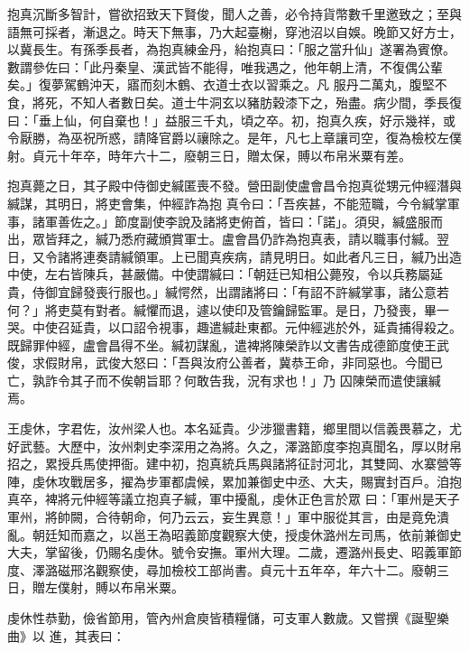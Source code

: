 \begin{pinyinscope}
 抱真沉斷多智計，嘗欲招致天下賢俊，聞人之善，必令持貨幣數千里邀致之；至與語無可採者，漸退之。時天下無事，乃大起臺榭，穿池沼以自娛。晚節又好方士，以冀長生。有孫季長者，為抱真練金丹，紿抱真曰：「服之當升仙」遂署為賓僚。數謂參佐曰：「此丹秦皇、漢武皆不能得，唯我遇之，他年朝上清，不復偶公輩矣。」復夢駕鶴沖天，寤而刻木鶴、衣道士衣以習乘之。凡
 服丹二萬丸，腹堅不食，將死，不知人者數日矣。道士牛洞玄以豬肪穀漆下之，殆盡。病少間，季長復曰：「垂上仙，何自棄也！」益服三千丸，頃之卒。初，抱真久疾，好示幾祥，或令厭勝，為巫祝所惑，請降官爵以禳除之。是年，凡七上章讓司空，復為檢校左僕射。貞元十年卒，時年六十二，廢朝三日，贈太保，賻以布帛米粟有差。



 抱真薨之日，其子殿中侍御史緘匿喪不發。營田副使盧會昌令抱真從甥元仲經潛與緘謀，其明日，將吏會集，仲經詐為抱
 真令曰：「吾疾甚，不能蒞職，今令緘掌軍事，諸軍善佐之。」節度副使李說及諸將吏俯首，皆曰：「諾」。須臾，緘盛服而出，眾皆拜之，緘乃悉府藏頒賞軍士。盧會昌仍詐為抱真表，請以職事付緘。翌日，又令諸將連奏請緘領軍。上已聞真疾病，請見明日。如此者凡三日，緘乃出造中使，左右皆陳兵，甚嚴備。中使謂緘曰：「朝廷已知相公薨歿，令以兵務屬延
 貴，侍御宜歸發喪行服也。」緘愕然，出謂諸將曰：「有詔不許緘掌事，諸公意若何？」將吏莫有對者。緘懼而退，遽以使印及管鑰歸監軍。是日，乃發喪，畢一哭。中使召延貴，以口詔令視事，趣遣緘赴東都。元仲經逃於外，延貴捕得殺之。既歸罪仲經，盧會昌得不坐。緘初謀亂，遣裨將陳榮詐以文書告成德節度使王武俊，求假財帛，武俊大怒曰：「吾與汝府公善者，冀恭王命，非同惡也。今聞已亡，孰詐令其子而不俟朝旨耶？何敢告我，況有求也！」乃
 囚陳榮而遣使讓緘焉。



 王虔休，字君佐，汝州梁人也。本名延貴。少涉獵書籍，鄉里間以信義畏慕之，尤好武藝。大歷中，汝州刺史李深用之為將。久之，澤潞節度李抱真聞名，厚以財帛招之，累授兵馬使押衙。建中初，抱真統兵馬與諸將征討河北，其雙岡、水寨營等陣，虔休攻戰居多，擢為步軍都虞候，累加兼御史中丞、大夫，賜實封百戶。洎抱真卒，裨將元仲經等議立抱真子緘，軍中擾亂，虔休正色言於眾
 曰：「軍州是天子軍州，將帥闕，合待朝命，何乃云云，妄生異意！」軍中服從其言，由是竟免潰亂。朝廷知而嘉之，以邕王為昭義節度觀察大使，授虔休潞州左司馬，依前兼御史大夫，掌留後，仍賜名虔休。號令安撫。軍州大理。二歲，遷潞州長史、昭義軍節度、澤潞磁邢洺觀察使，尋加檢校工部尚書。貞元十五年卒，年六十二。廢朝三日，贈左僕射，賻以布帛米粟。



 虔休性恭勤，儉省節用，管內州倉庾皆積糧儲，可支軍人數歲。又嘗撰《誕聖樂曲》以
 進，其表曰：




\end{pinyinscope}
